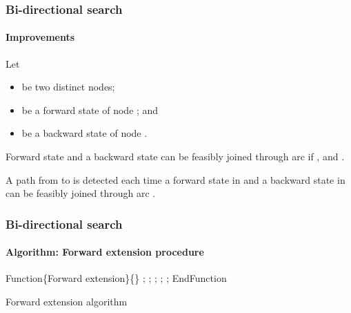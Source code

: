 \begin{frame}
  \frametitle{Bi-directional search}
  \framesubtitle{Improvements}
  Let
  \begin{itemize}
    \item {} be two distinct nodes;
    \item {} be a forward state of node ; and 
    \item {} be a backward state of node .
  \end{itemize}
  \begin{definition}
    Forward state  and a backward state  can be feasibly joined through arc  
    if , and .
  \end{definition}
  A path from  to  is detected each time a forward state in  and a backward state in  can be feasibly joined through arc .
\end{frame}

\begin{frame}
  \frametitle{Bi-directional search}
  \framesubtitle{Algorithm: Forward extension procedure}
  \begin{algorithm}[H]
    \scriptsize
    \begin{algorithmic}[1]
      \STATE Function\{Forward extension\}\{\}
        \label{algo2:setp:explore_arcs}
          \STATE {};
              \STATE {};
            \ENDIF
          \ENDFOR
          \STATE {};
            \STATE {};
          \ENDIF
        \ENDFOR
        \STATE {};
     \STATE EndFunction
    \end{algorithmic}
    \caption{Forward extension algorithm}
    \label{alg2:forward_extension}
  \end{algorithm}
\end{frame}


